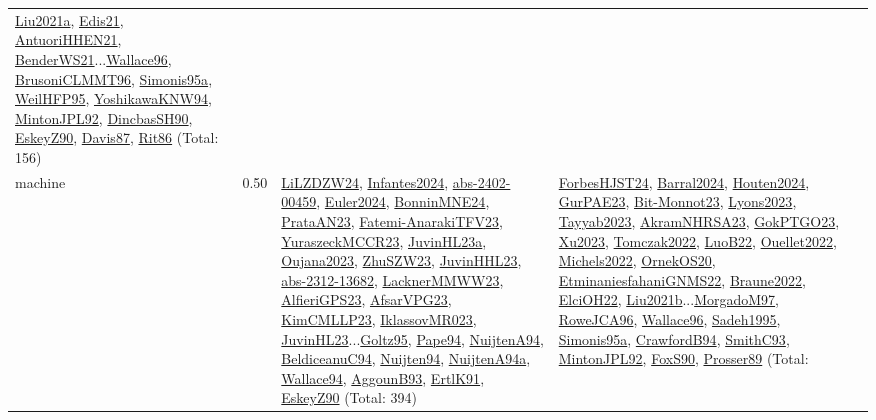 {\begin{longtable}{p{3cm}r>{\raggedright\arraybackslash}p{6cm}>{\raggedright\arraybackslash}p{6cm}>{\raggedright\arraybackslash}p{8cm}}
\hyperref[detail:Liu2021a]{Liu2021a}, \hyperref[detail:Edis21]{Edis21}, \hyperref[detail:AntuoriHHEN21]{AntuoriHHEN21}, \hyperref[detail:BenderWS21]{BenderWS21}...\hyperref[detail:Wallace96]{Wallace96}, \hyperref[detail:BrusoniCLMMT96]{BrusoniCLMMT96}, \hyperref[detail:Simonis95a]{Simonis95a}, \hyperref[detail:WeilHFP95]{WeilHFP95}, \hyperref[detail:YoshikawaKNW94]{YoshikawaKNW94}, \hyperref[detail:MintonJPL92]{MintonJPL92}, \hyperref[detail:DincbasSH90]{DincbasSH90}, \hyperref[detail:EskeyZ90]{EskeyZ90}, \hyperref[detail:Davis87]{Davis87}, \hyperref[detail:Rit86]{Rit86} (Total: 156)\\
\index{machine}\index{Scheduling!machine}machine &  0.50 & \hyperref[detail:LiLZDZW24]{LiLZDZW24}, \hyperref[detail:Infantes2024]{Infantes2024}, \hyperref[detail:abs-2402-00459]{abs-2402-00459}, \hyperref[detail:Euler2024]{Euler2024}, \hyperref[detail:BonninMNE24]{BonninMNE24}, \hyperref[detail:PrataAN23]{PrataAN23}, \hyperref[detail:Fatemi-AnarakiTFV23]{Fatemi-AnarakiTFV23}, \hyperref[detail:YuraszeckMCCR23]{YuraszeckMCCR23}, \hyperref[detail:JuvinHL23a]{JuvinHL23a}, \hyperref[detail:Oujana2023]{Oujana2023}, \hyperref[detail:ZhuSZW23]{ZhuSZW23}, \hyperref[detail:JuvinHHL23]{JuvinHHL23}, \hyperref[detail:abs-2312-13682]{abs-2312-13682}, \hyperref[detail:LacknerMMWW23]{LacknerMMWW23}, \hyperref[detail:AlfieriGPS23]{AlfieriGPS23}, \hyperref[detail:AfsarVPG23]{AfsarVPG23}, \hyperref[detail:KimCMLLP23]{KimCMLLP23}, \hyperref[detail:IklassovMR023]{IklassovMR023}, \hyperref[detail:JuvinHL23]{JuvinHL23}...\hyperref[detail:Goltz95]{Goltz95}, \hyperref[detail:Pape94]{Pape94}, \hyperref[detail:NuijtenA94]{NuijtenA94}, \hyperref[detail:BeldiceanuC94]{BeldiceanuC94}, \hyperref[detail:Nuijten94]{Nuijten94}, \hyperref[detail:NuijtenA94a]{NuijtenA94a}, \hyperref[detail:Wallace94]{Wallace94}, \hyperref[detail:AggounB93]{AggounB93}, \hyperref[detail:ErtlK91]{ErtlK91}, \hyperref[detail:EskeyZ90]{EskeyZ90} (Total: 394) & \hyperref[detail:ForbesHJST24]{ForbesHJST24}, \hyperref[detail:Barral2024]{Barral2024}, \hyperref[detail:Houten2024]{Houten2024}, \hyperref[detail:GurPAE23]{GurPAE23}, \hyperref[detail:Bit-Monnot23]{Bit-Monnot23}, \hyperref[detail:Lyons2023]{Lyons2023}, \hyperref[detail:Tayyab2023]{Tayyab2023}, \hyperref[detail:AkramNHRSA23]{AkramNHRSA23}, \hyperref[detail:GokPTGO23]{GokPTGO23}, \hyperref[detail:Xu2023]{Xu2023}, \hyperref[detail:Tomczak2022]{Tomczak2022}, \hyperref[detail:LuoB22]{LuoB22}, \hyperref[detail:Ouellet2022]{Ouellet2022}, \hyperref[detail:Michels2022]{Michels2022}, \hyperref[detail:OrnekOS20]{OrnekOS20}, \hyperref[detail:EtminaniesfahaniGNMS22]{EtminaniesfahaniGNMS22}, \hyperref[detail:Braune2022]{Braune2022}, \hyperref[detail:ElciOH22]{ElciOH22}, \hyperref[detail:Liu2021b]{Liu2021b}...\hyperref[detail:MorgadoM97]{MorgadoM97}, \hyperref[detail:RoweJCA96]{RoweJCA96}, \hyperref[detail:Wallace96]{Wallace96}, \hyperref[detail:Sadeh1995]{Sadeh1995}, \hyperref[detail:Simonis95a]{Simonis95a}, \hyperref[detail:CrawfordB94]{CrawfordB94}, \hyperref[detail:SmithC93]{SmithC93}, \hyperref[detail:MintonJPL92]{MintonJPL92}, \hyperref[detail:FoxS90]{FoxS90}, \hyperref[detail:Prosser89]{Prosser89} (Total: 
\end{longtable}}
